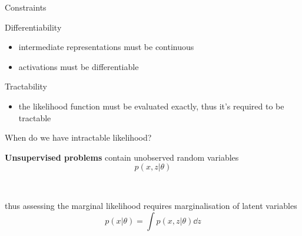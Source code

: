 \begin{frame}{Constraints}

	Differentiability
	\begin{itemize}
		\item intermediate representations must be continuous
		\item activations must be differentiable
	\end{itemize}

	Tractability
	\begin{itemize}
		\item the likelihood function must be evaluated exactly, thus it's required to be tractable
	\end{itemize}



\end{frame}




\begin{frame}{When do we have intractable likelihood?}

{\bf Unsupervised problems} contain unobserved random variables\\ 
\begin{equation*}
p(x, z|\theta)
\end{equation*}

~ 

thus assessing the marginal likelihood requires \alert{marginalisation of latent variables} 
\begin{equation*}
p(x|\theta) = \int p(x, z|\theta) \dd{z} 
\end{equation*}

\end{frame}





